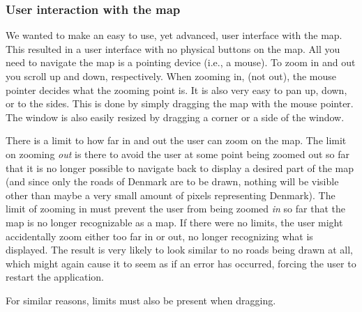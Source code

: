 \subsubsection{User interaction with the map}
We wanted to make an easy to use, yet advanced, user interface with the map. This resulted in a user interface with no physical buttons on the map. All you need to navigate the map is a pointing device (i.e., a mouse). To zoom in and out you scroll up and down, respectively. When zooming in, (not out), the mouse pointer decides what the zooming point is. It is also very easy to pan up, down, or to the sides. This is done by simply dragging the map with the mouse pointer. The window is also easily resized by dragging a corner or a side of the window.

There is a limit to how far in and out the user can zoom on the map. The limit on zooming \textsl{out} is there to avoid the user at some point being zoomed out so far that it is no longer possible to navigate back to display a desired part of the map (and since only the roads of Denmark are to be drawn, nothing will be visible other than maybe a very small amount of pixels representing Denmark). The limit of zooming in must prevent the user from being zoomed \textsl{in} so far that the map is no longer recognizable as a map. If there were no limits, the user might accidentally zoom either too far in or out, no longer recognizing what is displayed. The result is very likely to look similar to no roads being drawn at all, which might again cause it to seem as if an error has occurred, forcing the user to restart the application.

For similar reasons, limits must also be present when dragging.

